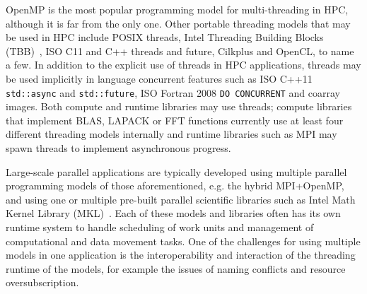 
OpenMP is the most popular programming model for multi-threading in HPC,
although it is far from the only one.
Other portable threading models that may be used in HPC include
POSIX threads,
Intel\regtm{} Threading Building Blocks (TBB)~\cite{pheatt2008intel},
ISO C11 and C++ threads and future, Cilkplus and
OpenCL, to name a few. 
In addition to the explicit use of threads in HPC applications,
threads may be used implicitly in language concurrent features such as
ISO C++11 \texttt{std::async} and \texttt{std::future},
ISO Fortran 2008 \texttt{DO CONCURRENT} and coarray images.
Both compute and runtime libraries may use threads;
compute libraries that implement BLAS, LAPACK or FFT functions
currently use at least four different threading models internally and
runtime libraries such as MPI may spawn threads to implement asynchronous progress.

Large-scale parallel applications are typically developed using multiple parallel programming models of 
those aforementioned, e.g. the hybrid MPI+OpenMP, and using one or multiple pre-built parallel scientific
libraries such as Intel Math Kernel Library (MKL)~\cite{wang2014intel}.
Each of these models and libraries often has its own runtime system to handle scheduling of work units 
and management of computational and data movement tasks. 
One of the challenges for using multiple models in one application is the interoperability and
interaction of the threading runtime of the models, for example the issues of naming conflicts and resource
oversubscription. 

